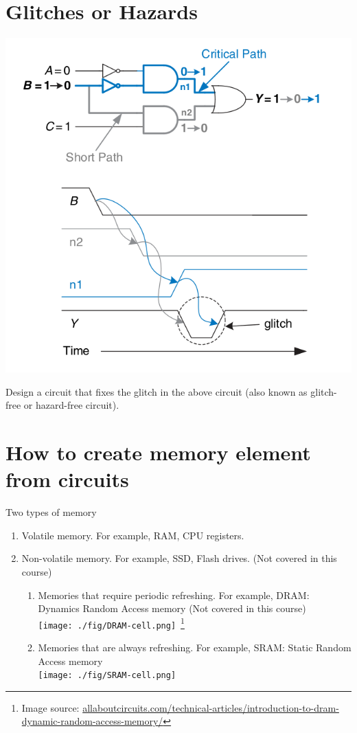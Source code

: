 \section{Glitches or Hazards}
\includegraphics[width=0.6\linewidth]{fig/fig2.76-timing-of-a-glitch.png}
\begin{definition}

\end{definition}
\vspace{5em}

\begin{example}
  Design a circuit that fixes the glitch in the above circuit (also known as
  glitch-free or hazard-free circuit).
\end{example}
\vspace{10em}


\section{How to create memory element from circuits}

Two types of memory
\begin{enumerate}
  \item Volatile memory. For example, RAM, CPU registers.
  \item Non-volatile memory. For example, SSD, Flash drives. (Not covered in this course)
    \begin{enumerate}
    \item Memories that require periodic refreshing. For example, DRAM: Dynamics Random Access memory (Not covered in this course)\\
      \texttt{[image: ./fig/DRAM-cell.png]}~\footnote{Image
        source: \url{allaboutcircuits.com/technical-articles/introduction-to-dram-dynamic-random-access-memory/}}
    \item Memories that are always refreshing. For example, SRAM: Static Random
      Access memory~\cite[Appendix~B.64]{stephen2022fundamentals}\\
      \texttt{[image: ./fig/SRAM-cell.png]}
    \end{enumerate}
\end{enumerate}

